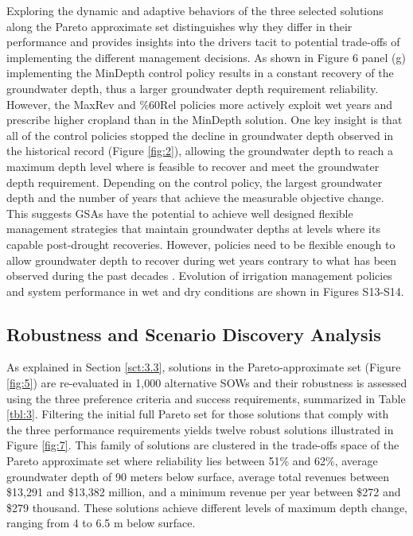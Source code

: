 \documentclass[a4paper,fleqn]{cas-sc}
\begin{document}
Exploring the dynamic and adaptive behaviors of the three selected solutions along the Pareto approximate set distinguishes why they differ in their performance and provides insights into the drivers tacit to potential trade-offs of implementing the different management decisions. As shown in Figure 6 panel (g) implementing the MinDepth control policy results in a constant recovery of the groundwater depth, thus a larger groundwater depth requirement reliability. However, the MaxRev and \%60Rel policies more actively exploit wet years and prescribe higher cropland than in the MinDepth solution. One key insight is that all of the control policies stopped the decline in groundwater depth observed in the historical record (Figure \ref{fig:2}), allowing the groundwater depth to reach a maximum depth level where is feasible to recover and meet the groundwater depth requirement. Depending on the control policy, the largest groundwater depth and the number of years that achieve the measurable objective change. This suggests GSAs have the potential to achieve well designed flexible management strategies that maintain groundwater depths at levels where its capable post-drought recoveries. However, policies need to be flexible enough to allow groundwater depth to recover during wet years contrary to what has been observed during the past decades \citep{liu_groundwater_2022,alam_post-drought_2021}. Evolution of irrigation management policies and system performance in wet and dry conditions are shown in Figures S13-S14.

\subsection{Robustness and Scenario Discovery Analysis}

As explained in Section \ref{sct:3.3}, solutions in the Pareto-approximate set (Figure \ref{fig:5}) are re-evaluated in 1,000 alternative SOWs and their robustness is assessed using the three preference criteria and success requirements, summarized in Table \ref{tbl:3}. Filtering the initial full Pareto set for those solutions that comply with the three performance requirements yields twelve robust solutions illustrated in Figure \ref{fig:7}. This family of solutions are clustered in the trade-offs space of the Pareto approximate set where reliability lies between 51\% and 62\%, average groundwater depth of 90 meters below surface, average total revenues between \$13,291 and \$13,382 million, and a minimum revenue per year between \$272 and \$279 thousand. These solutions achieve different levels of maximum depth change, ranging from 4 to 6.5 m below surface. 
\end{document}
